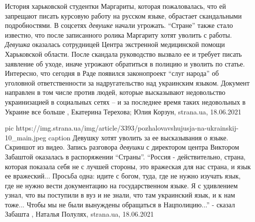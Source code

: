 История харьковской студентки Маргариты, которая пожаловалась, что ей запрещают
писать курсовую работу на русском языке, обрастает скандальными подробностями.
В соцсетях \emph{девушке} начали угрожать. \enquote{Стране} также стало известно, что после
записанного ролика Маргариту хотят уволить с работы.  \emph{Девушка} оказалась
сотрудницей Центра экстренной медицинской помощи Харьковской области. После
скандала руководство вызвало ее и требует писать заявление об уходе, иначе
угрожают обратиться в полицию и уволить по статье.  Интересно, что сегодня в
Раде появился законопроект \enquote{слуг народа} об уголовной ответственности за
надругательство над украинским языком. Документ направлен в том числе против
людей, которые высказывают недовольство украинизацией в социальных сетях – и за
последнее время таких недовольных в Украине все больше
, 
Екатерина Терехова; Юлия Корзун, strana.ua, 18.06.2021

\ifcmt
  pic https://img.strana.ua/img/article/3393/pozhalovavshujusja-na-ukrainskij-10_main.jpeg
	caption Девушку хотят уволить за ее высказывания о языке. Скриншот из видео.
\fi
Запись разговора \emph{девушки} с директором центра Виктором Забаштой оказалась в
распоряжении \enquote{Страны}.  \enquote{Россия - действительно, страна,
которая показала себя не с лучшей стороны, это вражеская для нас страна, и язык
ее вражеский...  Просьба одна: идите с богом, туда, где не нужно изучать язык,
где не нужно вести документацию на государственном языке. Я с удивлением узнал,
что вы поступили в вуз и не знали, что там украинский язык, и к нам тоже...
Чтобы мы не были вынуждены обращаться в Нацполицию...} - сказал Забашта
, 
Наталья Полулях, strana.ua, 18.06.2021
